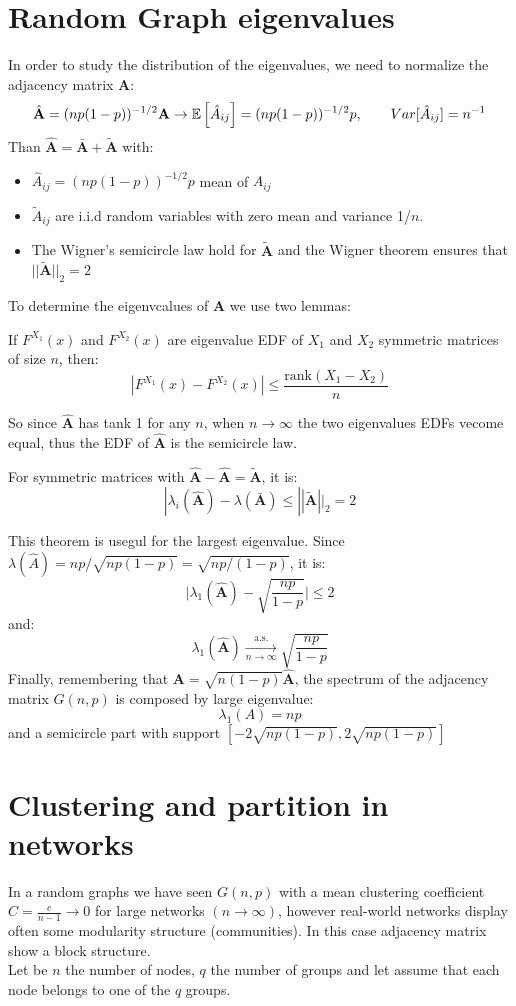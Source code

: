 \section{Random Graph eigenvalues}
In order to study the distribution of the eigenvalues, we need to normalize the adjacency matrix $\mathbf{A}$:
\[
\hat{\mathbf{A}} = (np(1-p))^{-1/2} \mathbf{A} \to \mathbb{E}\left[\hat{A}_{ij}\right] = (np(1-p))^{-1/2}p, \qquad Var[\hat{A}_{ij}] = n^{-1}
\]
Than $\hat{\mathbf{A}} = \bar{\mathbf{A}} + \tilde{\mathbf{A}}$ with:
\begin{itemize}
	\item $\hat{A}_{ij} = (np(1-p))^{-1/2}p$ mean of $A_{ij}$
	\item $\tilde{A}_{ij}$ are i.i.d random variables with zero mean and variance 1/$n$.
	\item The Wigner's semicircle law hold for $\tilde{\mathbf{A}}$ and the Wigner theorem ensures that $||\tilde{\mathbf{A}}||_2 = 2$
\end{itemize}
To determine the eigenvcalues of $\mathbf{A}$ we use two lemmas:
\begin{mytheorem}
	If $F^{X_1}(x)$ and $F^{X_2}(x)$ are eigenvalue EDF of $X_1$ and $X_2$ symmetric matrices of size $n$, then:
	\[
	|F^{X_1}(x) - F^{X_2}(x)| \leq \frac{\text{rank}(X_1-X_2)}{n}
	\]
\end{mytheorem}
So since $\hat{\mathbf{A}}$ has tank 1 for any $n$, when $n \to \infty$ the two eigenvalues EDFs vecome equal, thus the EDF of $\hat{\mathbf{A}}$ is the semicircle law.
\begin{mytheorem}
	For symmetric matrices with $\hat{\mathbf{A}} - \hat{\mathbf{A}} = \tilde{\mathbf{A}}$, it is:
	\[
|\lambda_i(\hat{\mathbf{A}}) - \lambda(\bar{\mathbf{A}})\leq ||\tilde{\mathbf{A}}||_2 = 2
	\]
\end{mytheorem}
This theorem is usegul for the largest eigenvalue. Since $\lambda(\hat{A}) = np/\sqrt{np(1-p)} = \sqrt{np/(1-p)}$, it is:
\[
\Big| \lambda_1(\hat{\mathbf{A}}) - \sqrt{\frac{np}{1-p}}\Big|\leq 2
\]
and:
\[
\lambda_1(\hat{\mathbf{A}}) \xrightarrow[n \to \infty]{\text{a.s.}}\sqrt{\frac{np}{1-p}}
\]
Finally, remembering that $\mathbf{A} = \sqrt{n(1-p)}\hat{\mathbf{A}}$, the spectrum of the adjacency matrix $G(n,p)$ is composed by large eigenvalue:
\[
\lambda_1(A) = np
\]
and a semicircle part with support $[-2\sqrt{np(1-p)},2\sqrt{np(1-p)}]$
\section{Clustering and partition in networks}
In a random graphs we have seen $G(n,p)$ with a mean clustering coefficient $C = \frac{c}{n-1}\to 0$ for large networks $(n \to \infty)$, however real-world networks display often some modularity structure (communities). In this case adjacency matrix show a block structure.\\
Let be $n$ the number of nodes, $q$ the number of groups and let assume that each node belongs to one of the $q$ groups.\\
